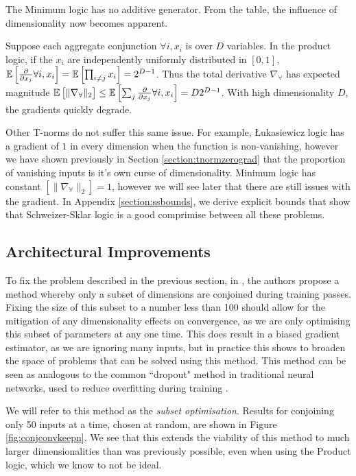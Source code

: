 The Minimum logic has no additive generator. From the table, the influence of dimensionality now becomes apparent. 

Suppose each aggregate conjunction $\forall i, x_i$ is over $D$ variables. In the product logic, if the $x_i$ are independently uniformly distributed in $[0,1]$, $\mathbb{E}\left[\frac{\partial}{\partial x_j} \forall i, x_i\right] = \mathbb{E}\left[\prod_{i \neq j} x_i \right] = 2^{D-1}$. Thus the total derivative $\nabla_\forall$ has expected magnitude $\mathbb{E}\left[\lVert \nabla_\forall \rVert_2\right] \leq \mathbb{E}\left[\sum_j \frac{\partial}{\partial x_j} \forall i, x_i \right] = D2^{D-1}$. With high dimensionality $D$, the gradients quickly degrade.

Other T-norms do not suffer this same issue. For example, Łukasiewicz logic has a gradient of $1$ in every dimension when the function is non-vanishing, however we have shown previously in Section \ref{section:tnormzerograd} that the proportion of vanishing inputs is it's own curse of dimensionality. Minimum logic has constant $\left[\lVert \nabla_\forall \rVert_2\right] = 1$, however we will see later that there are still issues with the gradient. In Appendix \ref{section:ssbounds}, we derive explicit bounds that show that Schweizer-Sklar logic is a good comprimise between all these problems.

\subsection{Architectural Improvements}

To fix the problem described in the previous section, in \cite{analyzefuzzy}, the authors propose a method whereby only a subset of dimensions are conjoined during training passes. Fixing the size of this subset to a number less than 100 should allow for the mitigation of any dimensionality effects on convergence, as we are only optimising this subset of parameters at any one time. This does result in a biased gradient estimator, as we are ignoring many inputs, but in practice this shows to broaden the space of problems that can be solved using this method. This method can be seen as analogous to the common ``dropout" method in traditional neural networks, used to reduce overfitting during training \cite{dropout}. 

We will refer to this method as the \textit{subset optimisation}. Results for conjoining only 50 inputs at a time, chosen at random, are shown in Figure \ref{fig:conjconvkeepn}. We see that this extends the viability of this method to much larger dimensionalities than was previously possible, even when using the Product logic, which we know to not be ideal.

